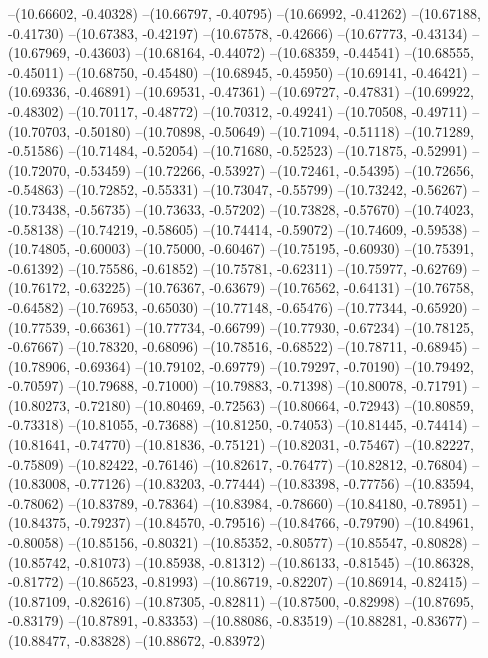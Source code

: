 --(10.66602, -0.40328)
--(10.66797, -0.40795)
--(10.66992, -0.41262)
--(10.67188, -0.41730)
--(10.67383, -0.42197)
--(10.67578, -0.42666)
--(10.67773, -0.43134)
--(10.67969, -0.43603)
--(10.68164, -0.44072)
--(10.68359, -0.44541)
--(10.68555, -0.45011)
--(10.68750, -0.45480)
--(10.68945, -0.45950)
--(10.69141, -0.46421)
--(10.69336, -0.46891)
--(10.69531, -0.47361)
--(10.69727, -0.47831)
--(10.69922, -0.48302)
--(10.70117, -0.48772)
--(10.70312, -0.49241)
--(10.70508, -0.49711)
--(10.70703, -0.50180)
--(10.70898, -0.50649)
--(10.71094, -0.51118)
--(10.71289, -0.51586)
--(10.71484, -0.52054)
--(10.71680, -0.52523)
--(10.71875, -0.52991)
--(10.72070, -0.53459)
--(10.72266, -0.53927)
--(10.72461, -0.54395)
--(10.72656, -0.54863)
--(10.72852, -0.55331)
--(10.73047, -0.55799)
--(10.73242, -0.56267)
--(10.73438, -0.56735)
--(10.73633, -0.57202)
--(10.73828, -0.57670)
--(10.74023, -0.58138)
--(10.74219, -0.58605)
--(10.74414, -0.59072)
--(10.74609, -0.59538)
--(10.74805, -0.60003)
--(10.75000, -0.60467)
--(10.75195, -0.60930)
--(10.75391, -0.61392)
--(10.75586, -0.61852)
--(10.75781, -0.62311)
--(10.75977, -0.62769)
--(10.76172, -0.63225)
--(10.76367, -0.63679)
--(10.76562, -0.64131)
--(10.76758, -0.64582)
--(10.76953, -0.65030)
--(10.77148, -0.65476)
--(10.77344, -0.65920)
--(10.77539, -0.66361)
--(10.77734, -0.66799)
--(10.77930, -0.67234)
--(10.78125, -0.67667)
--(10.78320, -0.68096)
--(10.78516, -0.68522)
--(10.78711, -0.68945)
--(10.78906, -0.69364)
--(10.79102, -0.69779)
--(10.79297, -0.70190)
--(10.79492, -0.70597)
--(10.79688, -0.71000)
--(10.79883, -0.71398)
--(10.80078, -0.71791)
--(10.80273, -0.72180)
--(10.80469, -0.72563)
--(10.80664, -0.72943)
--(10.80859, -0.73318)
--(10.81055, -0.73688)
--(10.81250, -0.74053)
--(10.81445, -0.74414)
--(10.81641, -0.74770)
--(10.81836, -0.75121)
--(10.82031, -0.75467)
--(10.82227, -0.75809)
--(10.82422, -0.76146)
--(10.82617, -0.76477)
--(10.82812, -0.76804)
--(10.83008, -0.77126)
--(10.83203, -0.77444)
--(10.83398, -0.77756)
--(10.83594, -0.78062)
--(10.83789, -0.78364)
--(10.83984, -0.78660)
--(10.84180, -0.78951)
--(10.84375, -0.79237)
--(10.84570, -0.79516)
--(10.84766, -0.79790)
--(10.84961, -0.80058)
--(10.85156, -0.80321)
--(10.85352, -0.80577)
--(10.85547, -0.80828)
--(10.85742, -0.81073)
--(10.85938, -0.81312)
--(10.86133, -0.81545)
--(10.86328, -0.81772)
--(10.86523, -0.81993)
--(10.86719, -0.82207)
--(10.86914, -0.82415)
--(10.87109, -0.82616)
--(10.87305, -0.82811)
--(10.87500, -0.82998)
--(10.87695, -0.83179)
--(10.87891, -0.83353)
--(10.88086, -0.83519)
--(10.88281, -0.83677)
--(10.88477, -0.83828)
--(10.88672, -0.83972)
